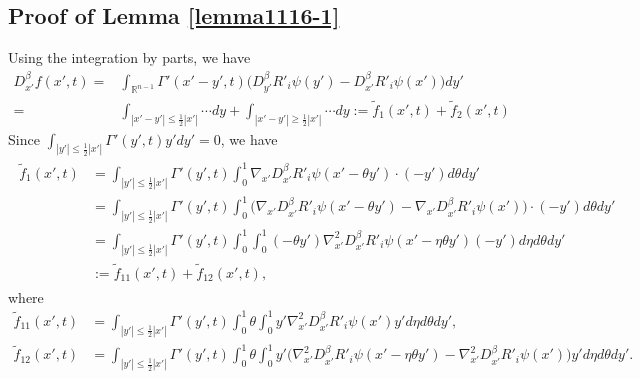 \documentclass{amsart}
\numberwithin{equation}{section}
\newcommand{\na}{\nabla}
\newcommand {\be}{\beta}
\newcommand{\Rn}{{\mathbb R}^{n-1}}
\newcommand{\te}{\theta}
\newcommand{\Ga}{\Gamma}
\begin{document}

\subsection{Proof of Lemma \ref{lemma1116-1}}
\label{prooflemma3-1}

Using the integration by parts, we have 
\begin{align*}
D_{x'}^\be  f(x',t)  = & \int_{\Rn}    \Ga'(x' -y', t)     \big(   D_{y'}^\be  R'_i \psi(y')   -  D_{x'}^\be   R'_i \psi(x')    \big)  dy'\\
=&\int_{|x' -y'| \leq \frac12 |x'|}  \cdots dy+\int_{|x' -y'| \geq  \frac12 |x'|}\cdots dy:=\tilde f_1(x',t) +\tilde f_2(x',t)
\end{align*}
Since $ \int_{|y'| \leq \frac12 |x'|} \Ga'(y',t) y' dy' =0$, we have 
\begin{align*}%
\begin{split}
 \tilde  f_1(x',t)
 & = \int_{|y'| \leq \frac12 |x'|} \Ga'(y',t)   \int_0^1 \na_{x'}    D_{x'}^\be R'_i \psi (x' -\theta y') \cdot (-y') d \theta dy'\\
 & = \int_{|y'| \leq \frac12 |x'|} \Ga'(y',t)   \int_0^1 \Big(  \na_{x'}   D_{x'}^\be  R'_i \psi (x' -\theta y') - \na_{x'}  D_{x'}^\be R'_i \psi (x' ) \Big) \cdot (-y') d \theta dy'\\
 & = \int_{|y'| \leq \frac12 |x'|} \Ga'(y',t)   \int_0^1  \int_0^1 (-\te y')  \na^2_{x'}   D_{x'}^\be  R'_i \psi (x' -\eta \theta y')  (- y') d\eta   d \theta dy'\\
& := \tilde f_{11}(x',t) +\tilde f_{12}(x',t),
\end{split}
\end{align*}
where 
\begin{align*}
 \tilde f_{11} (x',t) & =  \int_{|y'| \leq \frac12 |x'|} \Ga'(y',t)   \int_0^1  \te \int_0^1     y'        \na^2_{x'}    D_{x'}^\be R'_i \psi (x'  )    y'      d\eta   d \theta dy',\\
 \tilde f_{12}(x',t)& = \int_{|y'| \leq \frac12 |x'|} \Ga'(y',t)   \int_0^1  \te  \int_0^1  y' \Big(      \na^2_{x'}   D_{x'}^\be R'_i \psi (x' -\eta \theta y') -     \na^2_{x'}   D_{x'}^\be R'_i \psi (x' )  \Big)   y' d\eta   d \theta dy'.
 \end{align*}
\end{document}
